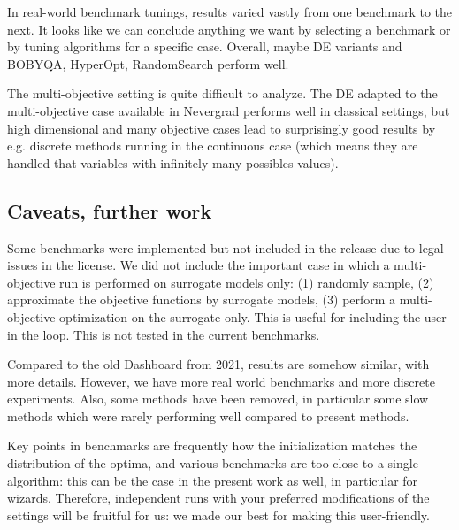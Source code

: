 In real-world benchmark tunings, results varied vastly from one benchmark to the next.  It looks like we can conclude 
anything we want by selecting a benchmark or by tuning algorithms for a specific case. Overall, maybe DE variants and
BOBYQA, HyperOpt, RandomSearch perform well.

The multi-objective setting is quite difficult to analyze. The DE adapted to the multi-objective case available in
Nevergrad\cite{pde,mode} performs well in classical settings, but high dimensional and many objective cases lead to surprisingly good
results  by e.g. discrete methods running in the continuous case (which means they are handled that variables with
infinitely many possibles values).

\subsection{Caveats, further work}
Some benchmarks were implemented but not included in the release due to legal issues in the license. 
We did not include the important case in which a multi-objective run is performed on surrogate models only: (1) randomly sample, (2) approximate the objective functions by surrogate models, (3) perform a multi-objective optimization on the surrogate only. This is useful for including the user in the loop. This is not tested in the current benchmarks.

Compared to the old Dashboard from 2021, results are somehow similar, with more details. However, we have more real world benchmarks and more discrete experiments. Also,
some methods have been removed, in particular some slow methods which were rarely performing well compared to present methods.

Key points in benchmarks are frequently how the initialization matches the distribution of the optima, and various
benchmarks are too close to a single algorithm: this can be the case in the present work as well, in particular for
wizards. Therefore, independent runs with your preferred modifications of the settings will be fruitful for us: we made our best
for making this user-friendly.
